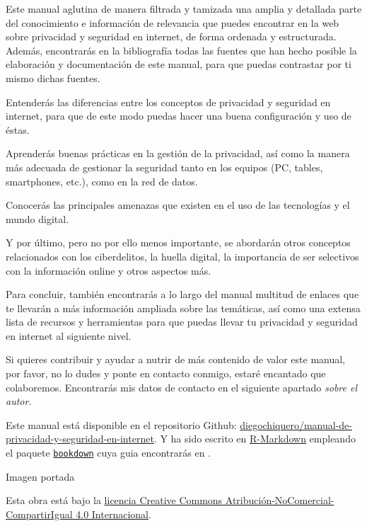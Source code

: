 \documentclass[
  a4paper,
  openany]{book}
\begin{document}
Este manual aglutina de manera filtrada y tamizada una amplia y detallada parte del conocimiento e información de relevancia que puedes encontrar en la web sobre privacidad y seguridad en internet, de forma ordenada y estructurada. Además, encontrarás en la bibliografía todas las fuentes que han hecho posible la elaboración y documentación de este manual, para que puedas contrastar por ti mismo dichas fuentes.

Entenderás las diferencias entre los conceptos de privacidad y seguridad en internet, para que de este modo puedas hacer una buena configuración y uso de éstas.

Aprenderás buenas prácticas en la gestión de la privacidad, así como la manera más adecuada de gestionar la seguridad tanto en los equipos (PC, tables, smartphones, etc.), como en la red de datos.

Conocerás las principales amenazas que existen en el uso de las tecnologías y el mundo digital.

Y por último, pero no por ello menos importante, se abordarán otros conceptos relacionados con los ciberdelitos, la huella digital, la importancia de ser selectivos con la información online y otros aspectos más.

Para concluir, también encontrarás a lo largo del manual multitud de enlaces que te llevarán a más información ampliada sobre las temáticas, así como una extensa lista de recursos y herramientas para que puedas llevar tu privacidad y seguridad en internet al siguiente nivel.

Si quieres contribuir y ayudar a nutrir de más contenido de valor este manual, por favor, no lo dudes y ponte en contacto conmigo, estaré encantado que colaboremos. Encontrarás mis datos de contacto en el siguiente apartado \emph{sobre el autor}.

Este manual está disponible en el repositorio Github: \href{https://github.com/diegochiquero/manual-de-privacidad-y-seguridad-en-internet}{diegochiquero/manual-de-privacidad-y-seguridad-en-internet}. Y ha sido escrito en \href{http://rmarkdown.rstudio.com}{R-Markdown} empleando el paquete \href{https://bookdown.org/}{\texttt{bookdown}} cuya guia encontrarás en \citep{R-bookdown}.

Imagen portada \citep{freepik}

Esta obra está bajo la \href{https://creativecommons.org/licenses/by-nc-sa/4.0/deed.es}{licencia Creative Commons Atribución-NoComercial-CompartirIgual 4.0 Internacional}.
\end{document}
